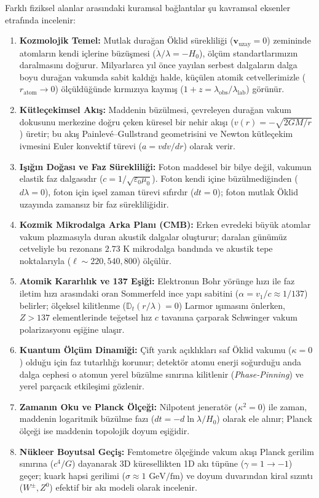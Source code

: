 Farklı fiziksel alanlar arasındaki kuramsal bağlantılar şu kavramsal eksenler etrafında incelenir:
\begin{enumerate}
    \item \textbf{Kozmolojik Temel:} Mutlak durağan Öklid sürekliliği ($\mathbf{v}_{\mathrm{uzay}}=0$) zemininde atomların kendi içlerine büzüşmesi ($\dot{\lambda}/\lambda = -H_0$), ölçüm standartlarımızın daralmasını doğurur. Milyarlarca yıl önce yayılan serbest dalgaların dalga boyu durağan vakumda sabit kaldığı halde, küçülen atomik cetvellerimizle ($r_{\mathrm{atom}} \to 0$) ölçüldüğünde kırmızıya kaymış ($1+z = \lambda_{\mathrm{obs}}/\lambda_{\mathrm{lab}}$) görünür.
    \item \textbf{Kütleçekimsel Akış:} Maddenin büzülmesi, çevreleyen durağan vakum dokusunu merkezine doğru çeken küresel bir nehir akışı ($v(r) = -\sqrt{2GM/r}$) üretir; bu akış Painlev\'e--Gullstrand geometrisini ve Newton kütleçekim ivmesini Euler konvektif türevi ($a = v dv/dr$) olarak verir.
    \item \textbf{Işığın Doğası ve Faz Sürekliliği:} Foton maddesel bir bilye değil, vakumun elastik faz dalgasıdır ($c = 1/\sqrt{\varepsilon_0\mu_0}$). Foton kendi içine büzülmediğinden ($d\lambda = 0$), foton için içsel zaman türevi sıfırdır ($dt = 0$); foton mutlak Öklid uzayında zamansız bir faz sürekliliğidir.
    \item \textbf{Kozmik Mikrodalga Arka Planı (CMB):} Erken evredeki büyük atomlar vakum plazmasıyla duran akustik dalgalar oluşturur; daralan günümüz cetveliyle bu rezonans $2.73\text{ K}$ mikrodalga bandında ve akustik tepe noktalarıyla ($\ell \sim 220, 540, 800$) ölçülür.
    \item \textbf{Atomik Kararlılık ve 137 Eşiği:} Elektronun Bohr yörünge hızı ile faz iletim hızı arasındaki oran Sommerfeld ince yapı sabitini ($\alpha = v_1/c \approx 1/137$) belirler; ölçeksel kilitlenme ($\mathbb{D}_t(r/\lambda)=0$) Larmor ışımasını önlerken, $Z > 137$ elementlerinde teğetsel hız $c$ tavanına çarparak Schwinger vakum polarizasyonu eşiğine ulaşır.
    \item \textbf{Kuantum Ölçüm Dinamiği:} Çift yarık açıklıkları saf Öklid vakumu ($\kappa=0$) olduğu için faz tutarlılığı korunur; detektör atomu enerji soğurduğu anda dalga cephesi o atomun yerel büzülme sınırına kilitlenir (\textit{Phase-Pinning}) ve yerel parçacık etkileşimi gözlenir.
    \item \textbf{Zamanın Oku ve Planck Ölçeği:} Nilpotent jeneratör ($\kappa^2=0$) ile zaman, maddenin logaritmik büzülme fazı ($dt = -d\ln\lambda/H_0$) olarak ele alınır; Planck ölçeği ise maddenin topolojik doyum eşiğidir.
    \item \textbf{Nükleer Boyutsal Geçiş:} Femtometre ölçeğinde vakum akışı Planck gerilim sınırına ($c^4/G$) dayanarak 3D küresellikten 1D akı tüpüne ($\gamma = 1 \to -1$) geçer; kuark hapsi gerilimi ($\sigma \approx 1\text{ GeV/fm}$) ve doyum duvarından kiral sızıntı ($W^\pm, Z^0$) efektif bir akı modeli olarak incelenir.
\end{enumerate}

